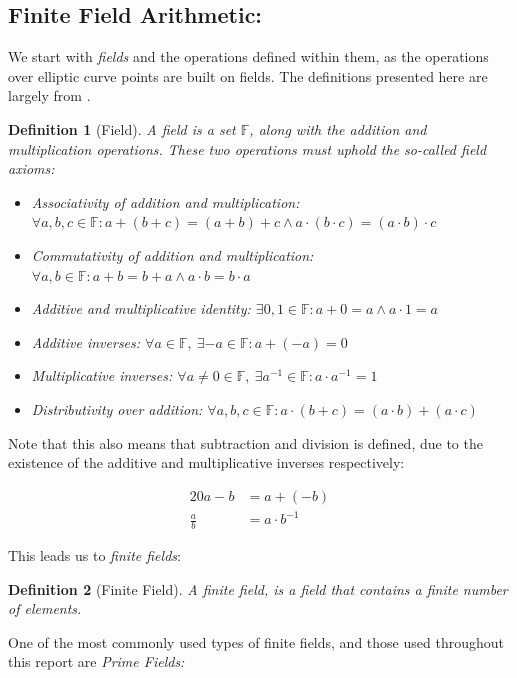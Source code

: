 \documentclass{article}
\newtheorem{definition}{Definition}[section]
\newcommand{\eq}[1]{\begin{alignat*}{20}#1\end{alignat*}}
\newcommand{\F}{\mathbb{F}}
\begin{document}
\subsection{Finite Field Arithmetic:} \label{finite-field-arithmetic}

We start with \textit{fields} and the operations defined within them,
as the operations over elliptic curve points are built on fields. The
definitions presented here are largely from \cite{elliptic-curves}.

\begin{definition}[Field]
	A field is a set $\F$, along with the \textit{addition} and
	\textit{multiplication} operations. These two operations must
	uphold the so-called \textit{field axioms}:

	\begin{itemize}
		\item Associativity of addition and multiplication:
		$\forall a,b,c \in \F : a + (b + c) = (a + b) + c \land a \cdot (b \cdot c) = (a \cdot b) \cdot c$
		\item Commutativity of addition and multiplication:
		$\forall a,b \in \F : a+b=b+a \land a \cdot b = b \cdot a$
		\item Additive and multiplicative identity:
		$\exists 0,1 \in \F : a + 0 = a \land a \cdot 1 = a$
		\item Additive inverses:
		$\forall a \in \F,\ \exists {-a} \in \F : a + ({-a}) = 0$
		\item Multiplicative inverses:
		$\forall a \neq 0 \in \F,\  \exists a^{-1} \in \F : a \cdot a^{-1} = 1$
		\item Distributivity over addition:
		$\forall a,b,c \in \F : a \cdot (b + c) = (a \cdot b) + (a \cdot c)$
	\end{itemize}
\end{definition}

Note that this also means that subtraction and division is defined,
due to the existence of the additive and multiplicative inverses
respectively:

\eq{
	a-b         &= a + (-b) \\
	\frac{a}{b} &= a \cdot b^{-1}
}

This leads us to \textit{finite fields}:

\begin{definition}[Finite Field]
	A finite field, is a field that contains a finite number of elements.
\end{definition}

One of the most commonly used types of finite fields, and those used
throughout this report are \textit{Prime Fields:} 
\end{document}
